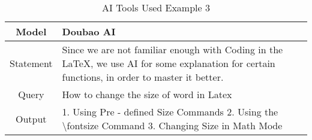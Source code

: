 \documentclass{mcmthesis}
\begin{document}
\begin{table}[htbp]
  \centering
  \caption{AI Tools Used Example 3}
  \label{tab:AI2}
  \begin{tabular}{c p{15cm}}
    \toprule
    Model & Doubao AI\\
    \midrule
    Statement & Since we are not familiar enough with Coding in the LaTeX, we use AI for some explanation for certain functions, in order to master it better.\\
    \midrule
    Query & How to change the size of word in Latex\\
    \midrule
    Output & 1. Using Pre - defined Size Commands
    2. Using the \textbackslash fontsize Command
    3. Changing Size in Math Mode\\
    \bottomrule
  \end{tabular}
\end{table}
\end{document}
